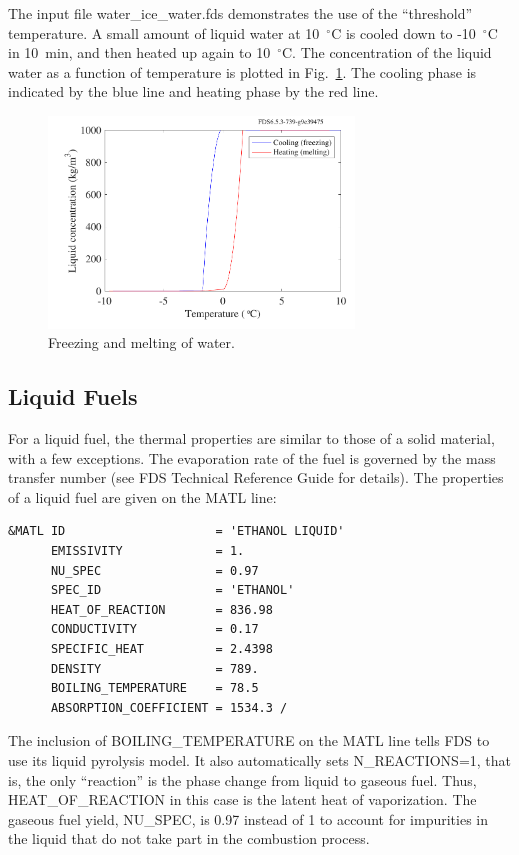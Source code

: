 \documentclass[11pt]{book}
\begin{document}
The input file {\ct water\_ice\_water.fds} demonstrates the use of the ``threshold'' temperature. A small amount of liquid water at 10~$^\circ$C is cooled down to -10~$^\circ$C in 10~min, and then heated up again to 10~$^\circ$C. The concentration of the liquid water as a function of temperature is plotted in Fig.~\ref{water_ice_water_plot}. The cooling phase is indicated by the blue line and heating phase by the red line.

\begin{figure}[ht]
\begin{center}
\includegraphics[width=3.2in]{SCRIPT_FIGURES/water_ice_water}
\end{center}
\caption[Results of the {\ct water\_ice\_water} test case]{Freezing and melting of water.}
\label{water_ice_water_plot}
\end{figure}




\subsection{Liquid Fuels}
\label{info:liquid_fuels}

For a liquid fuel, the thermal properties are similar to those of a solid
material, with a few exceptions. The evaporation rate of the fuel
is governed by the mass transfer number (see FDS Technical Reference
Guide for details). The properties of a liquid fuel are given on the {\ct MATL} line:
\begin{lstlisting}
&MATL ID                     = 'ETHANOL LIQUID'
      EMISSIVITY             = 1.
      NU_SPEC                = 0.97
      SPEC_ID                = 'ETHANOL'
      HEAT_OF_REACTION       = 836.98
      CONDUCTIVITY           = 0.17
      SPECIFIC_HEAT          = 2.4398
      DENSITY                = 789.
      BOILING_TEMPERATURE    = 78.5
      ABSORPTION_COEFFICIENT = 1534.3 /
\end{lstlisting}
The inclusion of {\ct BOILING\_TEMPERATURE} on the {\ct MATL} line tells FDS to use its liquid
pyrolysis model. It also automatically sets {\ct N\_REACTIONS=1}, that is, the only ``reaction'' is the
phase change from liquid to gaseous fuel. Thus, {\ct HEAT\_OF\_REACTION} in this case is the latent
heat of vaporization. The gaseous fuel yield, {\ct NU\_SPEC}, is 0.97 instead of 1 to account for
impurities in the liquid that do not take part in the combustion process.
\end{document}
